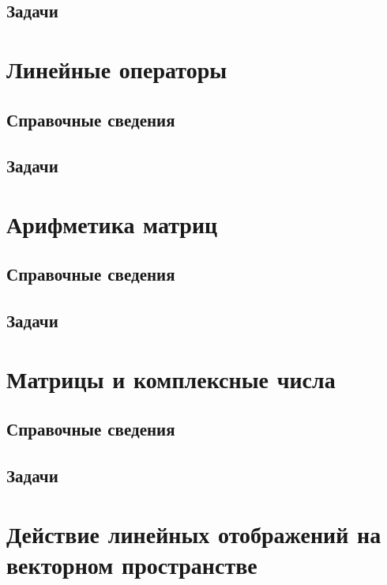 \subsection*{Задачи}



\section{Линейные операторы}

\subsection*{Справочные сведения}

\subsection*{Задачи}



\section{Арифметика матриц}

\subsection*{Справочные сведения}

\subsection*{Задачи}



\section{Матрицы и комплексные числа}

\subsection*{Справочные сведения}

\subsection*{Задачи}




\section{Действие линейных отображений на векторном пространстве}

